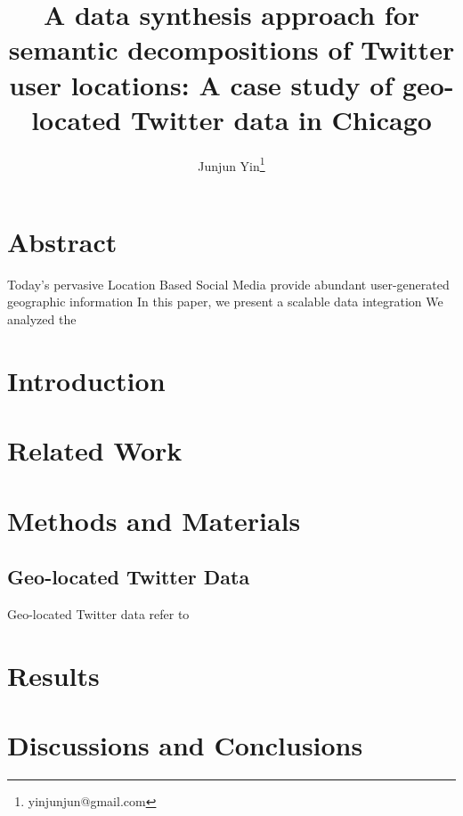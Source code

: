 \documentclass[a4paper,11pt]{article}
\begin{document}
\title{A data synthesis approach for semantic decompositions of Twitter user locations: A case study of geo-located Twitter data in Chicago}
\author[1]{Junjun Yin\thanks{yinjunjun@gmail.com}}
\renewcommand\Authands{ and }
\maketitle

\section*{Abstract}
Today's pervasive Location Based Social Media provide abundant user-generated geographic information
In this paper, we present a scalable data integration 
We analyzed the 



\section{Introduction}


\section{Related Work}



\section{Methods and Materials}
\subsection{Geo-located Twitter Data}
Geo-located Twitter data refer to  


\section{Results}


\section{Discussions and Conclusions}
\end{document}
